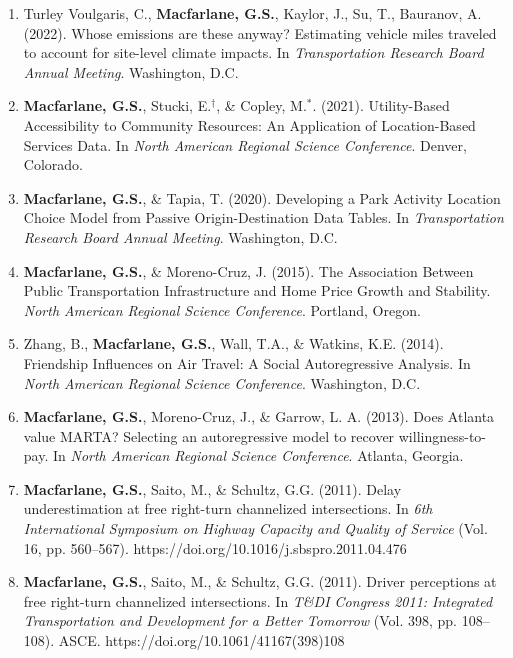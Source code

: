 \documentclass[margin,line]{res}
\newif\ifdetail
\newcounter{enuminitialize}
\newenvironment{myenum}[1][]
{%
 \setcounter{enuminitialize}{#1}
 \addtocounter{enuminitialize}{2}
 \begin{enumerate}[left= 4pt, itemsep=8pt, start=\value{enuminitialize}, label=\arabic*\addtocounter{enumi}{-2}]
}
{%
 \end{enumerate}
}
\begin{document}
\begin{resume}
\begin{myenum}[11]
\item Turley Voulgaris, C., \textbf{Macfarlane, G.S.}, Kaylor, J., Su, T., Bauranov, A. (2022). Whose emissions are these anyway? Estimating vehicle miles traveled to account for site-level climate impacts. In \textit{Transportation Research Board Annual Meeting}. Washington, D.C.
\item \textbf{Macfarlane, G.S.}, Stucki,  E.$^\dagger$,  \& Copley, M.$^*$. (2021). Utility-Based Accessibility to Community Resources: An Application of Location-Based Services Data. In \textit{North American Regional Science Conference}. Denver, Colorado.
\item \textbf{Macfarlane, G.S.}, \& Tapia, T. (2020). Developing a Park Activity Location Choice Model from Passive Origin-Destination Data Tables. In \textit{ Transportation Research Board Annual Meeting}. Washington, D.C.
\item \textbf{Macfarlane, G.S.}, \& Moreno-Cruz, J. (2015). The Association Between Public Transportation Infrastructure and Home Price Growth and Stability. \textit{North American Regional Science Conference}. Portland, Oregon.
\item Zhang, B., \textbf{Macfarlane, G.S.}, Wall, T.A., \& Watkins, K.E. (2014). Friendship Influences on Air Travel: A Social Autoregressive Analysis. In \textit{ North American Regional Science Conference}. Washington, D.C.
\item \textbf{Macfarlane, G.S.}, Moreno-Cruz, J., \& Garrow, L. A. (2013). Does Atlanta value MARTA? Selecting an autoregressive model to recover willingness-to-pay. In \textit{ North American Regional Science Conference}. Atlanta, Georgia.
\item \textbf{Macfarlane, G.S.}, Saito, M., \& Schultz, G.G. (2011). Delay underestimation at free right-turn channelized intersections. In \textit{ 6th
International Symposium on Highway Capacity and Quality of Service} (Vol. 16,
pp. 560–567). https://doi.org/10.1016/j.sbspro.2011.04.476 \ifdetail Citations:
6  \fi

\item \textbf{Macfarlane, G.S.}, Saito, M., \& Schultz, G.G. (2011). Driver
perceptions at free right-turn channelized intersections. In \textit{ T\&DI
Congress 2011: Integrated Transportation and Development for a Better Tomorrow} 
(Vol. 398, pp. 108–108). ASCE. https://doi.org/10.1061/41167(398)108 \ifdetail
Citations: 5  \fi
\end{myenum}


\noindent\makebox[\linewidth]{\rule{\linewidth}{0.4pt}}

\end{resume}
\end{document}

